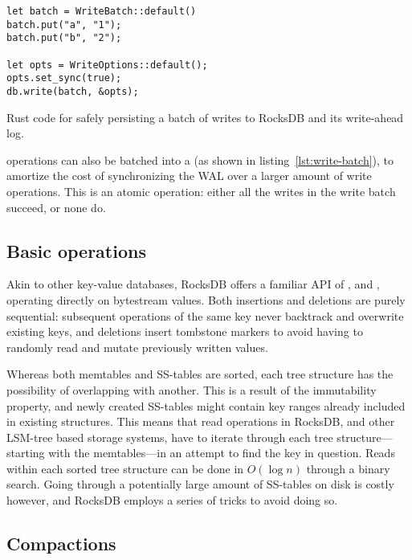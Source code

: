 \begin{listing}[H]
  \begin{verbatim}
let batch = WriteBatch::default()
batch.put("a", "1");
batch.put("b", "2");

let opts = WriteOptions::default();
opts.set_sync(true);
db.write(batch, &opts);
  \end{verbatim}

  \caption{Rust code for safely persisting a batch of writes to RocksDB and its
  write-ahead log.}\label{lst:write-batch}
\end{listing}

 operations can also be batched into a  (as shown in
listing~\ref{lst:write-batch}), to amortize the cost of synchronizing the WAL
over a larger amount of write operations. This is an atomic operation: either
all the writes in the write batch succeed, or none do.

\subsection{Basic operations}
Akin to other key-value databases, RocksDB offers a familiar API of
,  and , operating
directly on bytestream values. Both insertions and deletions are purely
sequential: subsequent  operations of the same key never backtrack and
overwrite existing keys, and deletions insert tombstone markers to avoid having
to randomly read and mutate previously written values.

Whereas both memtables and SS-tables are sorted, each tree structure has the
possibility of overlapping with another. This is a result of the immutability
property, and newly created SS-tables might contain key ranges already included
in existing structures. This means that read operations in RocksDB, and other
LSM-tree based storage systems, have to iterate through each tree
structure---starting with the memtables---in an attempt to find the key in
question. Reads within each sorted tree structure can be done in $ O(\log n) $
through a binary search. Going through a potentially large amount of SS-tables
on disk is costly however, and RocksDB employs a series of tricks to avoid doing
so.

\subsection{Compactions}\label{sec:compactions}

